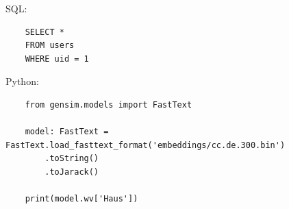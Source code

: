 \documentclass[chapterprefix=false, 12pt, a4paper, oneside, parskip=half, listof=totoc, bibliography=totoc, numbers=noendperiod]{scrbook}
\begin{document}
    SQL:

    \begin{verbatim}
    SELECT *
    FROM users
    WHERE uid = 1
    \end{verbatim}

    Python:

    \begin{verbatim}
    from gensim.models import FastText

    model: FastText = FastText.load_fasttext_format('embeddings/cc.de.300.bin')
        .toString()
        .toJarack()

    print(model.wv['Haus'])
    \end{verbatim}
\end{document}
